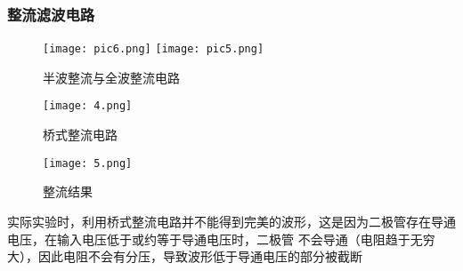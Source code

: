 \documentclass[11pt,a4paper]{article}
\begin{document}
\subsubsection{整流滤波电路}
\begin{figure}[H]
    \centering
    \texttt{[image: pic6.png]}
    \texttt{[image: pic5.png]}
    \caption{半波整流与全波整流电路}
\end{figure}
\begin{figure}[H]
    \centering
    \texttt{[image: 4.png]}
    \caption{桥式整流电路}
\end{figure}
\begin{figure}[H]
    \centering
    \texttt{[image: 5.png]}
    \caption{整流结果}
\end{figure}
实际实验时，利用桥式整流电路并不能得到完美的波形，这是因为二极管存在导通电压，在输入电压低于或约等于导通电压时，二极管
不会导通（电阻趋于无穷大），因此电阻不会有分压，导致波形低于导通电压的部分被截断
\end{document}
